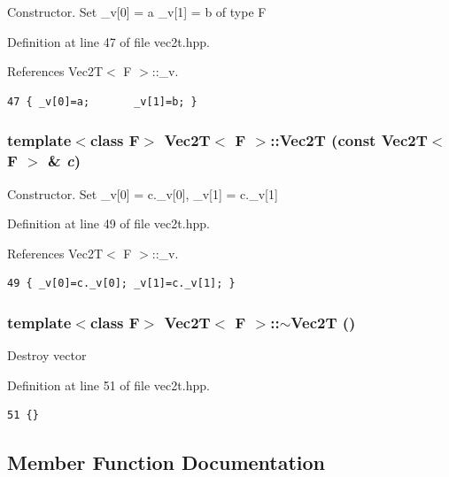 Constructor. Set \_\-v[0] = a \_\-v[1] = b of type F 

Definition at line 47 of file vec2t.hpp.

References Vec2T$<$ F $>$::\_\-v.

\footnotesize\begin{verbatim}47 { _v[0]=a;       _v[1]=b; }
\end{verbatim}\normalsize 


\subsubsection{\setlength{\rightskip}{0pt plus 5cm}template$<$class F$>$ {\bf Vec2T}$<$ F $>$::{\bf Vec2T} (const {\bf Vec2T}$<$ F $>$ \& {\em c})\hspace{0.3cm}{\tt  [inline]}}\label{classVec2T_2be6e20f4cae659b62140233b9209e4a_2be6e20f4cae659b62140233b9209e4a}


Constructor. Set \_\-v[0] = c.\_\-v[0], \_\-v[1] = c.\_\-v[1] 

Definition at line 49 of file vec2t.hpp.

References Vec2T$<$ F $>$::\_\-v.

\footnotesize\begin{verbatim}49 { _v[0]=c._v[0]; _v[1]=c._v[1]; }
\end{verbatim}\normalsize 


\subsubsection{\setlength{\rightskip}{0pt plus 5cm}template$<$class F$>$ {\bf Vec2T}$<$ F $>$::$\sim${\bf Vec2T} ()\hspace{0.3cm}{\tt  [inline]}}\label{classVec2T_aa4c09fd6b9a3e7bccd0496080ff07eb_aa4c09fd6b9a3e7bccd0496080ff07eb}


Destroy vector 

Definition at line 51 of file vec2t.hpp.

\footnotesize\begin{verbatim}51 {}
\end{verbatim}\normalsize 




\subsection{Member Function Documentation}
